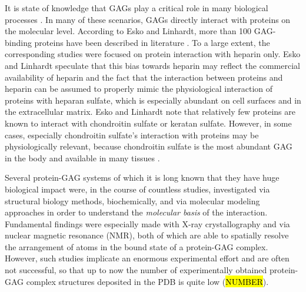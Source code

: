 It is state of knowledge that GAGs play a critical role in many biological
processes \cite{handel_2005}. In many of these scenarios, GAGs directly interact
with proteins on the molecular level. According to Esko and Linhardt, more than
100 GAG-binding proteins have been described in literature
\cite{essentials_glycobiology_protgags_2009}. To a large extent, the
corresponding studies were focused on protein interaction with heparin only.
Esko and Linhardt speculate that this bias towards heparin may reflect the
commercial availability of heparin and the fact that the interaction between
proteins and heparin can be assumed to properly mimic the physiological
interaction of proteins with heparan sulfate, which is especially abundant on
cell surfaces and in the extracellular matrix. Esko and Linhardt note that
relatively few proteins are known to interact with chondroitin sulfate or
keratan sulfate. However, in some cases, especially chondroitin sulfate's
interaction with proteins may be physiologically relevant, because chondroitin
sulfate is the most abundant GAG in the body
\cite{gandhi_structure_2008} and available in many tissues
\cite{essentials_glycobiology_protgags_2009}.

Several protein-GAG systems of which it is long known that they have huge
biological impact were, in the course of countless studies, investigated via
structural biology methods, biochemically, and via molecular modeling approaches
in order to understand the \textit{molecular basis} of the interaction.
Fundamental findings were especially made with X-ray crystallography and via
nuclear magnetic resonance (NMR), both of which are able to spatially resolve
the arrangement of atoms in the bound state of a protein-GAG complex. However,
such studies implicate an enormous experimental effort and are often not
successful, so that up to now the number of experimentally obtained protein-GAG
complex structures deposited in the PDB is quite low (\hl{NUMBER}).


